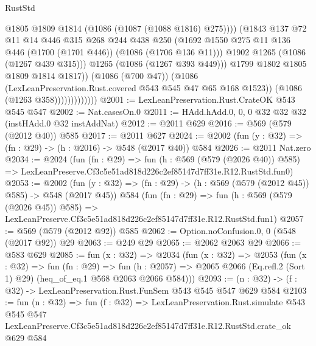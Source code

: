 \begin{lexlean}{RustStd}
\begin{coremodule}
                                    @1805
                                    @1809
                                    @1814
                                    (@1086 (@1087 (@1088 @1816) @275))))
                                (@1843
                                  @137
                                  @72
                                  @11
                                  @14
                                  @446
                                  @315
                                  @268
                                  @244
                                  @438
                                  @250
                                  (@1692
                                    @1550
                                    @275
                                    @11
                                    @136
                                    @446
                                    (@1700 (@1701 @446))
                                    (@1086 (@1706 @136 @11)))
                                  @1902
                                  @1265
                                  (@1086 (@1267 @439 @315)))
                                @1265
                                (@1086 (@1267 @393 @449)))
                              @1799
                              @1802
                              @1805
                              @1809
                              @1814
                              @1817))
                          (@1086 (@700 @47))
                          (@1086 (LexLeanPreservation.Rust.covered @543 @545 @47 @65 @168 @1523))
                          (@1086 (@1263 @358)))))))))))))
@2001 := LexLeanPreservation.Rust.CrateOK @543 @545 @547
@2002 := Nat.casesOn.{0}
@2011 := HAdd.hAdd.{0, 0, 0} @32 @32 @32 (instHAdd.{0} @32 instAddNat)
@2012 := @2011 @629
@2016 := @569 (@579 (@2012 @40)) @585
@2017 := @2011 @627
@2024 := @2002 (fun (y : @32) => (fn : @29) -> (h : @2016) -> @548 (@2017 @40)) @584
@2026 := @2011 Nat.zero
@2034 := @2024
    (fun (fn : @29) =>
    fun (h : @569 (@579 (@2026 @40)) @585) =>
    LexLeanPreserve.Cf3c5e51ad818d226c2ef85147d7ff31e.R12.RustStd.fun0)
@2053 := @2002
    (fun (y : @32) => (fn : @29) -> (h : @569 (@579 (@2012 @45)) @585) -> @548 (@2017 @45))
    @584
    (fun (fn : @29) =>
    fun (h : @569 (@579 (@2026 @45)) @585) =>
    LexLeanPreserve.Cf3c5e51ad818d226c2ef85147d7ff31e.R12.RustStd.fun1)
@2057 := @569 (@579 (@2012 @92)) @585
@2062 := Option.noConfusion.{0, 0} (@548 (@2017 @92)) @29
@2063 := @249 @29
@2065 := @2062 @2063 @29
@2066 := @583 @629
@2085 := fun (x : @32) =>
  @2034
    (fun (x : @32) =>
    @2053
      (fun (x : @32) =>
      fun (fn : @29) =>
      fun (h : @2057) =>
      @2065 @2066 (Eq.refl.{2} (Sort 1) @29) (heq_of_eq.{1} @568 @2063 @2066 @584)))
@2093 := (n : @32) -> (f : @32) -> LexLeanPreservation.Rust.FunSem @543 @545 @547 @629 @584
@2103 := fun (n : @32) =>
  fun (f : @32) =>
  LexLeanPreservation.Rust.simulate
    @543
    @545
    @547
    LexLeanPreserve.Cf3c5e51ad818d226c2ef85147d7ff31e.R12.RustStd.crate_ok
    @629
    @584
\end{coremodule}
\end{lexlean}
